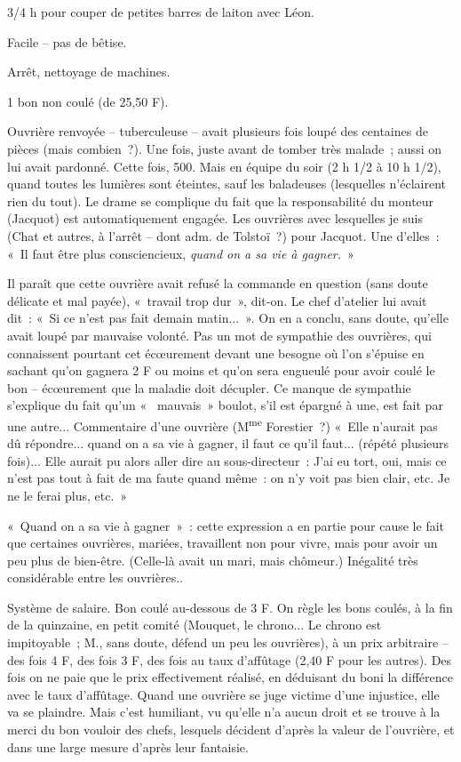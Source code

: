 \documentclass[french,twoside]{book} %
\begin{document}
3/4 h pour couper de petites barres de laiton avec Léon.\par
Facile – pas de bêtise.\par
Arrêt, nettoyage de machines.\par
1 bon non coulé (de 25,50 F).\par
Ouvrière renvoyée – tuberculeuse – avait plusieurs fois loupé des centaines de pièces (mais combien ?). Une fois, juste avant de tomber très malade ; aussi on lui avait pardonné. Cette fois, 500. Mais en équipe du soir (2 h 1/2 à 10 h 1/2), quand toutes les lumières sont éteintes, sauf les baladeuses (lesquelles n'éclairent rien du tout). Le drame se complique du fait que la responsabilité du monteur (Jacquot) est automatiquement engagée. Les ouvrières avec lesquelles je suis (Chat et autres, à l'arrêt – dont adm. de Tolstoï ?) pour Jacquot. Une d'elles : « Il faut être plus consciencieux, {\itshape quand on a sa vie à gagner.} »\par
Il paraît que cette ouvrière avait refusé la commande en question (sans doute délicate et mal payée), « travail trop dur », dit-on. Le chef d'atelier lui avait dit : « Si ce n'est pas fait demain matin... ». On en a conclu, sans doute, qu'elle avait loupé par mauvaise volonté. Pas un mot de sympathie des ouvrières, qui connaissent pourtant cet écœurement devant une besogne où l'on s'épuise en sachant qu'on gagnera 2 F ou moins et qu'on sera engueulé pour avoir coulé le bon – écœurement que la maladie doit décupler. Ce manque de sympathie s'explique du fait qu'un «  mauvais » boulot, s'il est épargné à une, est fait par une autre... Commentaire d'une ouvrière (M\textsuperscript{me} Forestier ?) « Elle n'aurait pas dû répondre... quand on a sa vie à gagner, il faut ce qu'il faut... (répété plusieurs fois)... Elle aurait pu alors aller dire au sous-directeur : J'ai eu tort, oui, mais ce n'est pas tout à fait de ma faute quand même : on n'y voit pas bien clair, etc. Je ne le ferai plus, etc. »\par
« Quand on a sa vie à gagner » : cette expression a en partie pour cause le fait que certaines ouvrières, mariées, travaillent non pour vivre, mais pour avoir un peu plus de bien-être. (Celle-là avait un mari, mais chômeur.) Inégalité très considérable entre les ouvrières..\par
Système de salaire. Bon coulé au-dessous de 3 F. On règle les bons coulés, à la fin de la quinzaine, en petit comité (Mouquet, le chrono... Le chrono est impitoyable ; M., sans doute, défend un peu les ouvrières), à un prix arbitraire – des fois 4 F, des fois 3 F, des fois au taux d'affûtage (2,40 F pour les autres). Des fois on ne paie que le prix effectivement réalisé, en déduisant du boni la différence avec le taux d'affûtage. Quand une ouvrière se juge victime d'une injustice, elle va se plaindre. Mais c'est humiliant, vu qu'elle n'a aucun droit et se trouve à la merci du bon vouloir des chefs, lesquels décident d'après la valeur de l'ouvrière, et dans une large mesure d'après leur fantaisie.\par
\end{document}
